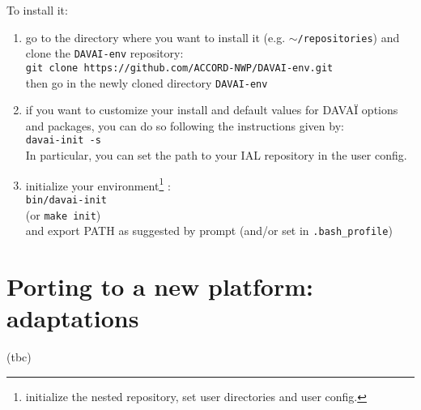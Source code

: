 \documentclass[a4paper,10pt,twoside]{article}
\begin{document}
\noindent To install it:
\begin{enumerate}[label=(D.\arabic*)]
 \item go to the directory where you want to install it (e.g. \texttt{$\sim$/repositories}) and\\
       clone the \texttt{DAVAI-env} repository:\\
       \texttt{git clone https://github.com/ACCORD-NWP/DAVAI-env.git}\\
       then go in the newly cloned directory \texttt{DAVAI-env}
 \item if you want to customize your install and default values for DAVAÏ options and packages, you can do so following the instructions given by:\\
       \texttt{davai-init -s}\\
       In particular, you can set the path to your IAL repository in the user config.
 \item initialize your environment\footnote{initialize the nested repository, set user directories and user config.} :\\
       \texttt{bin/davai-init}\\
       (or \texttt{make init})\\
       and export PATH as suggested by prompt (and/or set in \texttt{.bash\_profile})
\end{enumerate}







\newpage
\section{Porting to a new platform: adaptations}
(tbc)
\end{document}
